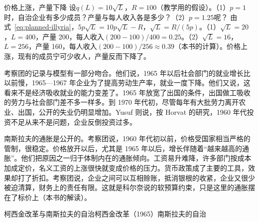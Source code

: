 \begin{example}{价格上涨，产量下降}\label{ex:planned-illyria}
设$q(L)=10\sqrt L$，$R=100$（教学用的假设）。（1）$p=1$时，自治企业有多少成员？产量与每人收入各是多少？（2）$p=1.25$呢？
\solution
由式~\eqref{eq:planned-illyria}，$5p\sqrt L=10p\sqrt L-R$，$\sqrt L=R/(5p)$。（1）$\sqrt L=20$，$L=400$，产量 200，每人收入$(200-100)/400=0.25$。（2）$\sqrt L=16$，$L=256$，产量 160，每人收入$(200-100)/256\approx0.39$（本书的计算）。价格上涨，现有的成员宁可少收人，产量反而下降了。
\end{example}

考察团的记录与模型有一部分吻合。他们说，1965 年以后社会部门的就业增长比以前慢，1965—1967 年企业为了提高劳动生产率，就业一度下降\cite{worldbank1978yu}。他们又说，这看来不是经济吸收就业的能力变差了\cite{worldbank1978yu}。1965 年放宽了出国的条件，出国做工吸收的劳力与社会部门差不多一样多\cite{worldbank1978yu}。到 1970 年代初，尽管每年有大批劳力离开农业、出国，公开的失业仍明显增加\cite{worldbank1978yu}。Yusuf 则说，按 Horvat 的研究，1960 年代投资不足从来不是问题，企业反倒投资过多\cite{yusuf1977}。

南斯拉夫的通胀是公开的。考察团说，1960 年代初以前，价格受国家相当严格的管制，很稳定\cite{worldbank1978yu}。价格放开以后，尤其是 1965 年以后，增长伴随着“越来越高的通胀”\cite{worldbank1978yu}。他们把原因之一归于体制内在的通胀倾向。工资易升难降，许多部门按成本加成定价，名义工资的上涨很快就变成价格的压力\cite{worldbank1978yu}。货币政策成了主要的工具，效果却打了折扣\cite{worldbank1978yu}。考察团说，企业之间可以互相赊账，抵消银根的收紧，企业又很少被迫清算，财务上的责任有限\cite{worldbank1978yu}。这就是科尔奈说的软预算约束，只是这里的通胀摆在了标价上（本书的解读）。

\begin{compare}{柯西金改革与南斯拉夫的自治}{柯西金改革（1965）}{南斯拉夫的自治}
\end{compare}

